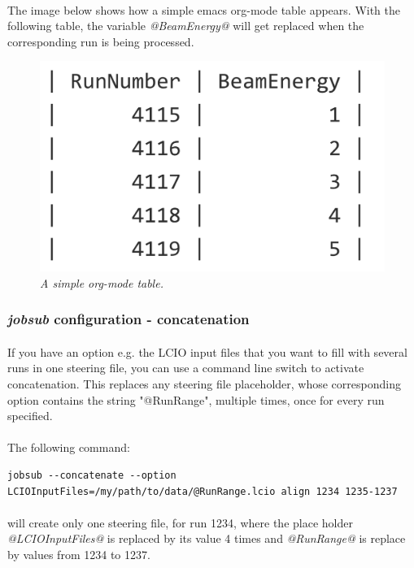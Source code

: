 \documentclass[11pt]{article}
\begin{document}
\paragraph{}
The image below shows how a simple emacs org-mode table appears. With the following table, the variable \textit{@BeamEnergy@} will get replaced when the corresponding run is being processed.
\begin{figure}[!ht]
	\centering
	\includegraphics[scale=0.25]{orgtable.png}
	\caption{\textit{A simple org-mode table.}}
\end{figure}
\subsubsection{\textit{jobsub} configuration - concatenation}
\paragraph{}
If you have an option e.g. the LCIO input files that you want to fill with several runs in one steering file, you can use a command line switch to activate concatenation. This replaces any steering file placeholder, whose corresponding option contains the string "@RunRange", multiple times, once for every run specified.
\paragraph{}
The following command:
\begin{verbatim}
jobsub --concatenate --option LCIOInputFiles=/my/path/to/data/@RunRange.lcio align 1234 1235-1237
\end{verbatim}
\paragraph{}
will create only one steering file, for run 1234, where the place holder \textit{@LCIOInputFiles@} is replaced by its value 4 times and \textit{@RunRange@} is replace by values from 1234 to 1237.
\end{document}
